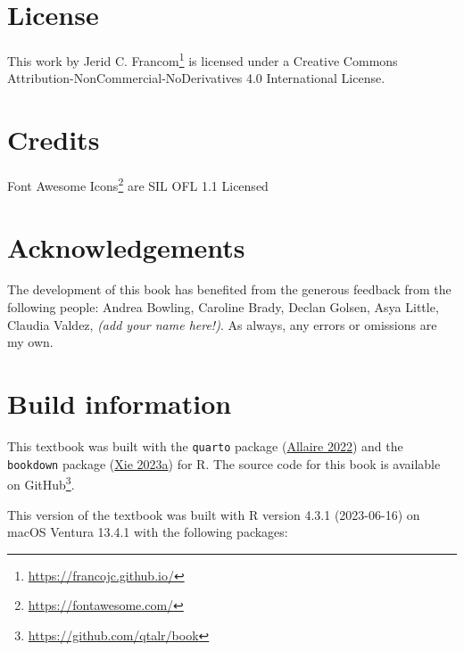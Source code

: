 \documentclass[
  letterpaper,
  DIV=11,
  numbers=noendperiod]{scrreport}
\theoremstyle{definition}
\theoremstyle{remark}
\DeclareRobustCommand{\href}[2]{#2\footnote{\url{#1}}}
\begin{document}
\hypertarget{license}{%
\section*{License}\label{license}}


This work by \href{https://francojc.github.io/}{Jerid C. Francom} is
licensed under a Creative Commons
Attribution-NonCommercial-NoDerivatives 4.0 International License.

\hypertarget{credits}{%
\section*{Credits}\label{credits}}


\href{https://fontawesome.com/}{Font Awesome Icons} are SIL OFL 1.1
Licensed

\hypertarget{acknowledgements}{%
\section*{Acknowledgements}\label{acknowledgements}}


The development of this book has benefited from the generous feedback
from the following people: Andrea Bowling, Caroline Brady, Declan
Golsen, Asya Little, Claudia Valdez, \emph{(add your name here!)}. As
always, any errors or omissions are my own.

\hypertarget{build-information}{%
\section*{Build information}\label{build-information}}


This textbook was built with the \texttt{quarto} package
(\protect\hyperlink{ref-R-quarto}{Allaire 2022}) and the
\texttt{bookdown} package (\protect\hyperlink{ref-R-bookdown}{Xie
2023a}) for R. The source code for this book is available on
\href{https://github.com/qtalr/book}{GitHub}.

This version of the textbook was built with R version 4.3.1 (2023-06-16)
on macOS Ventura 13.4.1 with the following packages:
\end{document}
